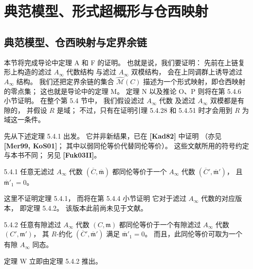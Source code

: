 
\section{典范模型、形式超概形与仓西映射}
\label{sec:5-4}

\subsection{典范模型、仓西映射与定界余链}
\label{subsec:5-4-1}

本节将完成导论中定理 A 和 F 的证明。
也就是说，我们要证明：
先前在上链复形上构造的滤过 $A_\infty$ 代数结构
与滤过 $A_\infty$ 双模结构，
会在上同调群上诱导滤过 $A_\infty$ 结构。
我们还把定界余链的集合
$\widehat{\mathcal M}(C)$
描述为一个形式映射，即仓西映射的零点集；
这也就是导论中的定理 M。
定理 N 以及推论 O、P
则将在第 5.4.6 小节证明。
在整个第 5.4 节中，
我们假设滤过 $A_\infty$ 代数
及滤过 $A_\infty$ 双模都是有隙的，
并假设 $R$ 是域；
不过，只有在证明引理 5.4.28
和 5.4.51 时才会用到 $R$ 为域这一条件。

先从下述定理 5.4.1 出发。
它并非新结果，已在
\textbf{[Kad82]} 中证明
（亦见 \textbf{[Mer99, KoS01]}；
其中以弱同伦等价代替同伦等价）。
这些文献所用的符号约定与本书不同；
另见 \textbf{[Fuk03II]}。

\begin{theorem}{5.4.1}\label{thm:5-4-1}
任意无滤过 $A_\infty$ 代数
$(\overline C,\overline{\mathfrak m})$
都同伦等价于一个
$A_\infty$ 代数
$(\overline C',\overline{\mathfrak m}')$，
且 $\overline{\mathfrak m}'_1=0$。
\end{theorem}

这里不证明定理 5.4.1，
而将在第 5.4.4 小节证明
它对于滤过 $A_\infty$ 代数的对应版本，
即定理 5.4.2。
该版本此前尚未见于文献。

\begin{theorem}{5.4.2}\label{thm:5-4-2}
任意有隙滤过 $A_\infty$ 代数
$(C,\mathfrak m)$
都同伦等价于一个有隙滤过
$A_\infty$ 代数
$(C',\mathfrak m')$，
其 $R$-约化
$(\overline C',\overline{\mathfrak m}')$
满足
$\overline{\mathfrak m}'_1=0$。
而且，此同伦等价可取为一个有隙
$A_\infty$ 同态。
\end{theorem}

定理 W 立即由定理 5.4.2 推出。

